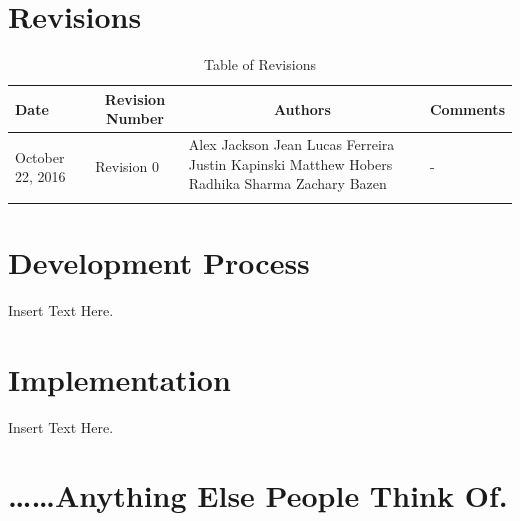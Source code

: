 \documentclass [12pt]{article}
\begin{document}

\tableofcontents
\listoftables

\pagebreak


\section{Revisions}
\begin{longtable}{| p{ } | p{ } | p{ } | p{ } |}

\hline 
\centering \textbf{Date} & 
\multicolumn{1}{c}{\textbf {Revision Number}} &
\multicolumn{1}{|c}{\textbf {Authors}} & 
\multicolumn{1}{|c|}{\textbf {Comments}} \\ \hline

\multirow{4}{*}{\centering October 22, 2016}  & 
\multirow{4}{*}{Revision 0}& 
{Alex Jackson \newline
		Jean Lucas Ferreira \newline
		Justin Kapinski\newline
		Matthew Hobers\newline
		Radhika Sharma\newline
		Zachary Bazen}
 &
\multirow{4}{*}{-} \\ 
\hline 

\caption{Table of Revisions} 
\end{longtable}



\pagebreak
\section{Development Process}
Insert Text Here.

\section{Implementation}
Insert Text Here. \\ 

\section{\dots \dots Anything Else People Think Of. }
\end{document}
